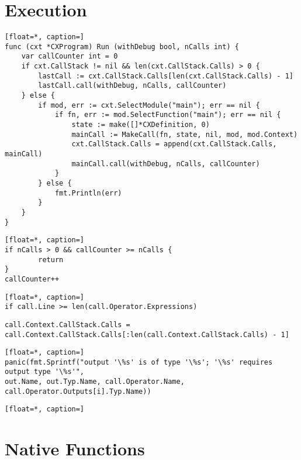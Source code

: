 \section{Execution}
\label{implementation-execution}

\begin{lstlisting}[float=*, caption=]
func (cxt *CXProgram) Run (withDebug bool, nCalls int) {
	var callCounter int = 0
	if cxt.CallStack != nil && len(cxt.CallStack.Calls) > 0 {
		lastCall := cxt.CallStack.Calls[len(cxt.CallStack.Calls) - 1]
		lastCall.call(withDebug, nCalls, callCounter)
	} else {
		if mod, err := cxt.SelectModule("main"); err == nil {
			if fn, err := mod.SelectFunction("main"); err == nil {
				state := make([]*CXDefinition, 0)
				mainCall := MakeCall(fn, state, nil, mod, mod.Context)
				cxt.CallStack.Calls = append(cxt.CallStack.Calls, mainCall)
				mainCall.call(withDebug, nCalls, callCounter)
			}
		} else {
			fmt.Println(err)
		}
	}
}
\end{lstlisting}

\begin{lstlisting}[float=*, caption=]
if nCalls > 0 && callCounter >= nCalls {
		return
}
callCounter++
\end{lstlisting}

\begin{lstlisting}[float=*, caption=]
if call.Line >= len(call.Operator.Expressions)
\end{lstlisting}

\begin{lstlisting}[float=*, caption=Popping out an Element from the Stack]
call.Context.CallStack.Calls = 
call.Context.CallStack.Calls[:len(call.Context.CallStack.Calls) - 1]
\end{lstlisting}

\begin{lstlisting}[float=*, caption=]
panic(fmt.Sprintf("output '\%s' is of type '\%s'; '\%s' requires output type '\%s'",
out.Name, out.Typ.Name, call.Operator.Name, call.Operator.Outputs[i].Typ.Name))
\end{lstlisting}

\begin{lstlisting}[float=*, caption=]
\end{lstlisting}

\section{Native Functions}
\label{implementation-native-functions}

